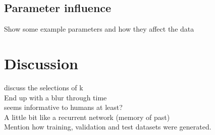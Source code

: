 \subsection{Parameter influence}
Show some example parameters and how they affect the data \\


\section{Discussion}

 discuss the selections of k \\
 End up with a blur through time \\
 seems informative to humans at least? \\
 A little bit like a recurrent network (memory of past) \\
 Mention how training, validation and test datasets were generated.\\



